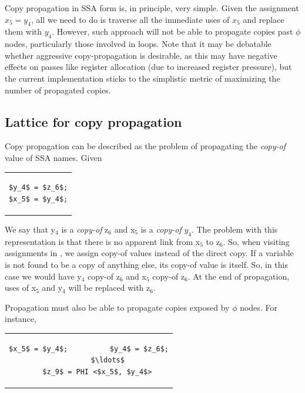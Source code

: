 Copy propagation in SSA form is, in principle, very simple.  Given
the assignment $x_5 = y_4$, all we need to do is traverse all the
immediate uses of $x_5$ and replace them with $y_4$.  However,
such approach will not be able to propagate copies past $\phi$
nodes, particularly those involved in loops.  Note that it may be
debatable whether aggressive copy-propagation is desirable, as
this may have negative effects on passes like register allocation
(due to increased register pressure), but the current
implementation sticks to the simplistic metric of maximizing the
number of propagated copies.

\subsection{Lattice for copy propagation}

Copy propagation can be described as the problem of propagating
the \textit{copy-of} value of SSA names.  Given

\begin{center}
  \begin{tabular}{c}
    \begin{lstlisting}
$y_4$ = $z_6$;
$x_5$ = $y_4$;
    \end{lstlisting}
  \end{tabular}
\end{center}

We say that y$_4$ is a \textit{copy-of} z$_6$ and x$_5$ is a
\textit{copy-of} $y_4$.  The problem with this representation is
that there is no apparent link from x$_5$ to z$_6$.  So, when
visiting assignments in , we assign
copy-of values instead of the direct copy.  If a variable is not
found to be a copy of anything else, its copy-of value is itself.
So, in this case we would have y$_4$ copy-of z$_6$ and x$_5$
copy-of z$_6$.  At the end of propagation, uses of x$_5$ and y$_4$
will be replaced with z$_6$.


Propagation must also be able to propagate copies exposed by
$\phi$ nodes.  For instance,

\begin{center}
  \begin{tabular}{c}
    \begin{lstlisting}
$x_5$ = $y_4$;          $y_4$ = $z_6$;
         $\ldots$
    $z_9$ = PHI <$x_5$, $y_4$>
    \end{lstlisting}
  \end{tabular}
\end{center}

